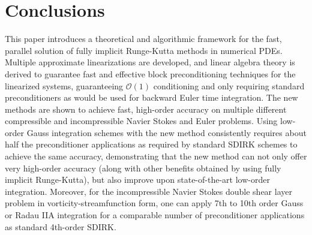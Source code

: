 \documentclass[review]{siamart}
\begin{document}
\section{Conclusions}\label{sec:conc}

This paper introduces a theoretical and algorithmic framework for the fast, parallel
solution of fully implicit Runge-Kutta methods in numerical PDEs. Multiple approximate
linearizations are developed, and linear algebra theory is derived to guarantee
fast and effective block preconditioning techniques for the linearized systems,
guaranteeing $\mathcal{O}(1)$ conditioning and only requiring standard preconditioners
as would be used for backward Euler time integration. The new methods are shown to achieve fast,
high-order accuracy on multiple different compressible and incompressible Navier
Stokes and Euler problems. Using low-order Gauss integration schemes
with the new method consistently requires about half the preconditioner applications as
required by standard SDIRK schemes to achieve the same accuracy, demonstrating that
the new method can not only offer very high-order accuracy (along with other benefits
obtained by using fully implicit Runge-Kutta), but also improve upon state-of-the-art
low-order integration. Moreover, for the incompressible Navier Stokes double shear
layer problem in vorticity-streamfunction form, one can apply 7th to 10th order Gauss
or Radau IIA integration for a comparable number of preconditioner applications as
standard 4th-order SDIRK.


\end{document}
